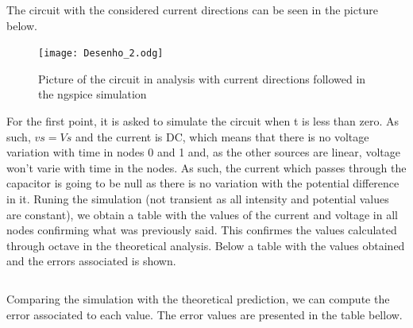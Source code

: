 \par The circuit with the considered current directions can be seen in the picture below.

\begin{figure}[h] \centering
\texttt{[image: Desenho\_2.odg]}
\caption{Picture of the circuit in analysis with current directions followed in the ngspice simulation}
\label{fig:Ngspice circuit}
\end{figure}

\par For the first point, it is asked to simulate the circuit when t is less than zero. As such, $vs=Vs$ and the current is DC, which means that there is no voltage variation with time in nodes 0 and 1 and, as the other sources are linear, voltage won't varie with time in the nodes. As such, the current which passes through the capacitor is going to be null as there is no variation with the potential difference in it. Runing the simulation (not transient as all intensity and potential values are constant), we obtain a table with the values of the current and voltage in all nodes confirming what was previously said. This confirmes the values calculated through octave in the theoretical analysis. Below a table with the values obtained and the errors associated is shown.

\vspace{5mm}
\begin{table}[H]
\centering
\begin{tabularx}{0.6\textwidth} {
  | >{\raggedright\arraybackslash}X
  | >{\raggedleft\arraybackslash}X | }
 \hline

\end{tabularx}
\end{table}
\vspace{5mm}

\par Comparing the simulation with the theoretical prediction, we can compute the error associated to each value. The error values are presented in the table bellow.

\vspace{5mm}
\begin{table}[H]
\centering
\begin{tabularx}{0.6\textwidth} {
  | >{\raggedright\arraybackslash}X
  | >{\raggedleft\arraybackslash}X | }
 \hline

\end{tabularx}
\end{table}
\vspace{5mm}


